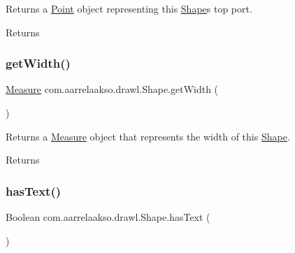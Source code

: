 Returns a \hyperlink{classcom_1_1aarrelaakso_1_1drawl_1_1_point}{Point} object representing this \hyperlink{classcom_1_1aarrelaakso_1_1drawl_1_1_shape}{Shape}\textquotesingle{}s top port. 

\begin{DoxyReturn}{Returns}

\end{DoxyReturn}
\mbox{\label{classcom_1_1aarrelaakso_1_1drawl_1_1_shape_a3e2c58984f1bcbc2e9e86cf30868561e}} 
\subsubsection{\texorpdfstring{get\+Width()}{getWidth()}}
{\footnotesize\ttfamily \hyperlink{classcom_1_1aarrelaakso_1_1drawl_1_1_measure}{Measure} com.\+aarrelaakso.\+drawl.\+Shape.\+get\+Width (\begin{DoxyParamCaption}{ }\end{DoxyParamCaption})}



Returns a \hyperlink{classcom_1_1aarrelaakso_1_1drawl_1_1_measure}{Measure} object that represents the width of this \hyperlink{classcom_1_1aarrelaakso_1_1drawl_1_1_shape}{Shape}. 

\begin{DoxyReturn}{Returns}

\end{DoxyReturn}
\mbox{\label{classcom_1_1aarrelaakso_1_1drawl_1_1_shape_a037a5515b2a6e1df1d1981aa5516e78e}} 
\subsubsection{\texorpdfstring{has\+Text()}{hasText()}}
{\footnotesize\ttfamily Boolean com.\+aarrelaakso.\+drawl.\+Shape.\+has\+Text (\begin{DoxyParamCaption}{ }\end{DoxyParamCaption})}



